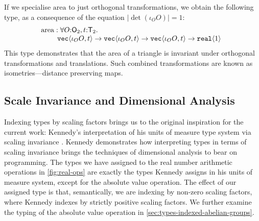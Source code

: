 \begin{example}
  If we specialise $\mathrm{area}$ to just orthogonal transformations,
  we obtain the following type, as a consequence of the equation
  $|\det (\iota_OO)| = 1$:
  \begin{displaymath}
    \begin{array}{@{}l}
      \mathrm{area} : \forall O\mathord:\SynOrth{2}, t\mathord:\SynTransl{2}.\ \\
      \hspace{0.8cm}\tyPrim{vec}{\iota_OO, t} \to \tyPrim{vec}{\iota_OO, t} \to \tyPrim{vec}{\iota_OO, t} \to \tyPrim{real}{1}
    \end{array}
  \end{displaymath}
  This type demonstrates that the area of a triangle is invariant
  under orthogonal transformations and translations. Such combined
  transformations are known as isometries---distance preserving maps.
\end{example}


\subsection{Scale Invariance and Dimensional Analysis}
\label{sec:scale-invariance}

Indexing types by scaling factors brings us to the original
inspiration for the current work: Kennedy's interpretation of his
units of measure type system via scaling invariance
\cite{kennedy97relational}. Kennedy demonstrates how interpreting
types in terms of scaling invariance brings the techniques of
dimensional analysis  to bear on programming. The types we
have assigned to the real number arithmetic operations in
\autoref{fig:real-ops} are exactly the types Kennedy assigns in his
units of measure system, except for the absolute value operation. The
effect of our assigned type is that, semantically, we are indexing by
non-zero scaling factors, where Kennedy indexes by strictly positive
scaling factors. We further examine the typing of the absolute value
operation in \autoref{sec:types-indexed-abelian-groups}.

